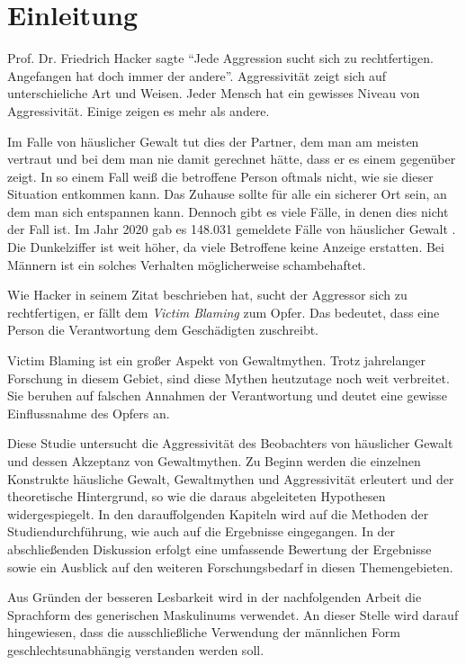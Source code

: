 \chapter{Einleitung}   \label{ch_1}
Prof. Dr. Friedrich Hacker sagte \enquote{Jede Aggression sucht sich zu rechtfertigen. Angefangen hat doch immer der andere}. \parencite{Friedrich_Hacker} Aggressivität zeigt sich auf unterschieliche Art und Weisen. Jeder Mensch hat ein gewisses Niveau von Aggressivität. Einige zeigen es mehr als andere. 


Im Falle von häuslicher Gewalt tut dies der Partner, dem man am meisten vertraut und bei dem man nie damit gerechnet hätte, dass er es einem gegenüber zeigt. In so einem Fall weiß die betroffene Person oftmals nicht, wie sie dieser Situation entkommen kann. Das Zuhause sollte für alle ein sicherer Ort sein, an dem man sich entspannen kann. Dennoch gibt es viele Fälle, in denen dies nicht der Fall ist. Im Jahr 2020 gab es 148.031 gemeldete Fälle von häuslicher Gewalt \parencite{häusliche_Gewalt}. Die Dunkelziffer ist weit höher, da viele Betroffene keine Anzeige erstatten. Bei Männern ist ein solches Verhalten möglicherweise schambehaftet.

Wie Hacker \parencite{Friedrich_Hacker} in seinem Zitat beschrieben hat, sucht der Aggressor sich zu rechtfertigen, er fällt dem \textit{Victim Blaming} zum Opfer. Das bedeutet, dass eine Person die Verantwortung dem Geschädigten zuschreibt. 

Victim Blaming ist ein großer Aspekt von Gewaltmythen. Trotz jahrelanger Forschung in diesem Gebiet, sind diese Mythen heutzutage noch weit verbreitet. 
Sie beruhen auf falschen Annahmen der Verantwortung und deutet eine gewisse Einflussnahme des Opfers an.

Diese Studie untersucht die Aggressivität des Beobachters von häuslicher Gewalt und dessen Akzeptanz von Gewaltmythen. Zu Beginn werden die einzelnen Konstrukte häusliche Gewalt, Gewaltmythen und Aggressivität erleutert und der theoretische Hintergrund, so wie die daraus abgeleiteten Hypothesen widergespiegelt. In den darauffolgenden Kapiteln wird auf die Methoden der Studiendurchführung, wie auch auf die Ergebnisse eingegangen. In der 
abschließenden Diskussion erfolgt eine umfassende Bewertung der Ergebnisse sowie ein Ausblick auf den weiteren Forschungsbedarf in diesen Themengebieten.

Aus Gründen der besseren Lesbarkeit wird in der nachfolgenden Arbeit die Sprachform des generischen Maskulinums verwendet. An dieser Stelle wird darauf hingewiesen, dass die ausschließliche Verwendung der männlichen Form geschlechtsunabhängig verstanden werden soll.